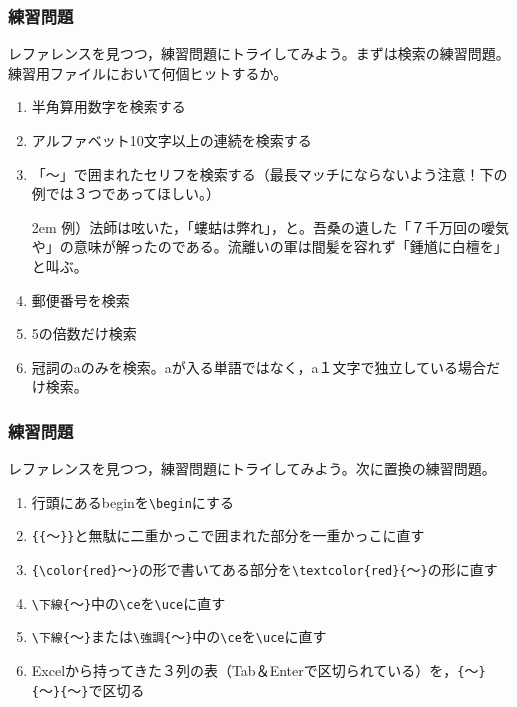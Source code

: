 \documentclass[10pt,dvipdfmx]{beamer}
\makeatletter
\def\verbstart{{\pxqgg@TI\pxqgg@cwm}\verb}
\def\verbend{{\pxqgg@TI\pxqgg@cwm}}
\makeatother
\begin{document}
\begin{frame}[t,fragile]
 \frametitle{練習問題}
 
レファレンスを見つつ，練習問題にトライしてみよう。まずは検索の練習問題。練習用ファイルにおいて何個ヒットするか。

\begin{enumerate}
\item 半角算用数字を検索する
\item アルファベット10文字以上の連続を検索する
\item 「〜」で囲まれたセリフを検索する（最長マッチにならないよう注意！下の例では３つであってほしい。）

\hangindent2em
例）法師は呟いた，「螻蛄は弊れ」，と。吾桑の遺した「７千万回の噯気や」の意味が解ったのである。流離いの軍は間髪を容れず「鍾馗に白檀を」と叫ぶ。

\item 郵便番号を検索
\item 5の倍数だけ検索
\item 冠詞のaのみを検索。aが入る単語ではなく，a１文字で独立している場合だけ検索。
\end{enumerate}

\end{frame}

\begin{frame}[t,fragile]
 \frametitle{練習問題}
レファレンスを見つつ，練習問題にトライしてみよう。次に置換の練習問題。

\begin{enumerate}
\item 行頭にあるbeginを\verbstart|\begin|\verbend にする
\item \verbstart|{{|\verbend 〜\verbstart|}}|\verbend と無駄に二重かっこで囲まれた部分を一重かっこに直す
\item \verbstart|{\color{red}|\verbend 〜\verbstart|}|\verbend の形で書いてある部分を\verbstart|\textcolor{red}{|\verbend 〜\verbstart|}|\verbend の形に直す
\item \verbstart|\下線{|\verbend 〜\verbstart|}|\verbend 中の\verbstart|\ce|\verbend を\verbstart|\uce|\verbend に直す
\item \verbstart|\下線{|\verbend 〜\verbstart|}|\verbend または\verbstart|\強調{|\verbend 〜\verbstart|}|\verbend 中の\verbstart|\ce|\verbend を\verbstart|\uce|\verbend に直す
\item Excelから持ってきた３列の表（Tab＆Enterで区切られている）を，\verbstart|{|\verbend 〜\verbstart|}{|\verbend 〜\verbstart|}{|\verbend 〜\verbstart|}|\verbend で区切る
\end{enumerate}

\end{frame}
\end{document}
